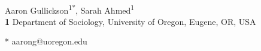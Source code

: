 \documentclass[10pt,letterpaper]{article}
\begin{document}
\vspace*{0.2in}

\begin{flushleft}
{\Large
\textbf{} %
}
\newline
\\
Aaron Gullickson\textsuperscript{1*},
Sarah Ahmed\textsuperscript{1}
\\
\bigskip
\textbf{1} Department of Sociology, University of Oregon, Eugene, OR, USA
\\
\bigskip

% 
%





* aarong@uoregon.edu

\end{flushleft}
\end{document}
